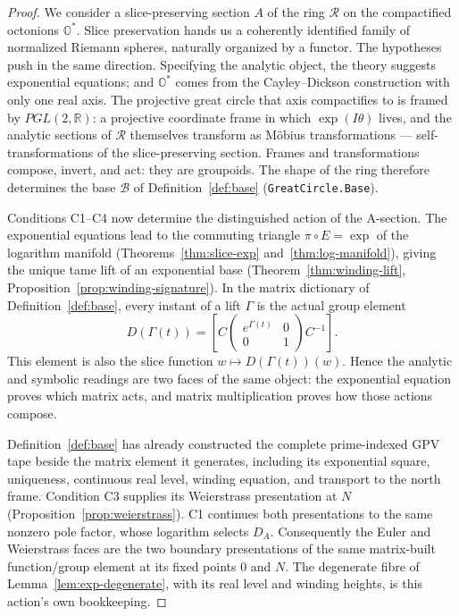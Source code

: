 \documentclass[11pt]{article}
\newcommand{\OO}{\mathbb{O}}
\newcommand{\RR}{\mathbb{R}}
\theoremstyle{plain}
\theoremstyle{definition}
\theoremstyle{remark}
\begin{document}
\begin{proof}
We consider a slice-preserving section $A$ of the ring $\mathcal R$ on the compactified
octonions $\OO^{*}$. Slice preservation hands us a coherently identified family of normalized
Riemann spheres, naturally organized by a functor. The
hypotheses push in the same direction. Specifying the analytic object, the theory suggests
exponential equations; and $\OO^{*}$ comes from the Cayley--Dickson construction with only one
real axis. The projective great circle that axis compactifies to is framed by $PGL(2,\RR)$: a
projective coordinate frame in which $\exp(I\theta)$ lives, and the analytic sections of
$\mathcal R$ themselves transform as M\"obius transformations --- self-transformations of the
slice-preserving section. Frames and transformations compose, invert, and act: they are
groupoids. The shape of the ring therefore determines the base $\mathcal B$ of
Definition~\ref{def:base} \textup{(}\texttt{GreatCircle.Base}\textup{)}.

Conditions C1--C4 now determine the distinguished action of the A-section. The exponential
equations lead to the commuting triangle $\pi\circ E=\exp$ of the logarithm manifold
\textup{(}Theorems~\ref{thm:slice-exp} and~\ref{thm:log-manifold}\textup{)}, giving the unique
tame lift of an exponential base \textup{(}Theorem~\ref{thm:winding-lift},
Proposition~\ref{prop:winding-signature}\textup{)}. In the matrix dictionary of
Definition~\ref{def:base}, every instant of a lift $\Gamma$ is the actual group element
\[
 D(\Gamma(t))
 =\left[C
   \begin{pmatrix}e^{\Gamma(t)}&0\\[2pt]0&1\end{pmatrix}
   C^{-1}\right].
\]
This element is also the slice function $w\mapsto D(\Gamma(t))(w)$. Hence the analytic and
symbolic readings are two faces of the same object: the exponential equation proves which matrix
acts, and matrix multiplication proves how those actions compose.

Definition~\ref{def:base} has already constructed the complete prime-indexed GPV tape beside the
matrix element it generates, including its exponential square, uniqueness, continuous real
level, winding equation, and transport to the north frame. Condition C3 supplies its Weierstrass
presentation at $N$
\textup{(}Proposition~\ref{prop:weierstrass}\textup{)}. C1 continues both presentations to the
same nonzero pole factor, whose logarithm selects $D_A$. Consequently the Euler and Weierstrass
faces are the two boundary presentations of the same matrix-built function/group element at its
fixed points $0$ and $N$. The degenerate fibre of
Lemma~\ref{lem:exp-degenerate}, with its real level and winding heights, is this action's own
bookkeeping.


\end{proof}
\end{document}
